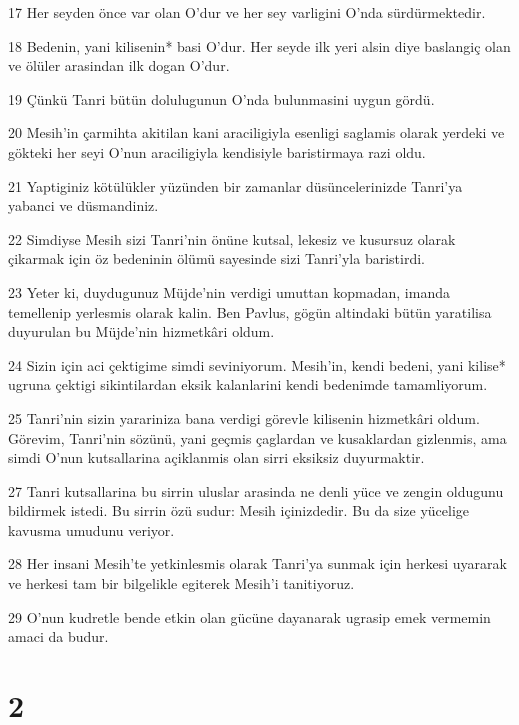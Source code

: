 \par 17 Her seyden önce var olan O'dur ve her sey varligini O'nda sürdürmektedir.
\par 18 Bedenin, yani kilisenin* basi O'dur. Her seyde ilk yeri alsin diye baslangiç olan ve ölüler arasindan ilk dogan O'dur.
\par 19 Çünkü Tanri bütün dolulugunun O'nda bulunmasini uygun gördü.
\par 20 Mesih'in çarmihta akitilan kani araciligiyla esenligi saglamis olarak yerdeki ve gökteki her seyi O'nun araciligiyla kendisiyle baristirmaya razi oldu.
\par 21 Yaptiginiz kötülükler yüzünden bir zamanlar düsüncelerinizde Tanri'ya yabanci ve düsmandiniz.
\par 22 Simdiyse Mesih sizi Tanri'nin önüne kutsal, lekesiz ve kusursuz olarak çikarmak için öz bedeninin ölümü sayesinde sizi Tanri'yla baristirdi.
\par 23 Yeter ki, duydugunuz Müjde'nin verdigi umuttan kopmadan, imanda temellenip yerlesmis olarak kalin. Ben Pavlus, gögün altindaki bütün yaratilisa duyurulan bu Müjde'nin hizmetkâri oldum.
\par 24 Sizin için aci çektigime simdi seviniyorum. Mesih'in, kendi bedeni, yani kilise* ugruna çektigi sikintilardan eksik kalanlarini kendi bedenimde tamamliyorum.
\par 25 Tanri'nin sizin yarariniza bana verdigi görevle kilisenin hizmetkâri oldum. Görevim, Tanri'nin sözünü, yani geçmis çaglardan ve kusaklardan gizlenmis, ama simdi O'nun kutsallarina açiklanmis olan sirri eksiksiz duyurmaktir.
\par 27 Tanri kutsallarina bu sirrin uluslar arasinda ne denli yüce ve zengin oldugunu bildirmek istedi. Bu sirrin özü sudur: Mesih içinizdedir. Bu da size yücelige kavusma umudunu veriyor.
\par 28 Her insani Mesih'te yetkinlesmis olarak Tanri'ya sunmak için herkesi uyararak ve herkesi tam bir bilgelikle egiterek Mesih'i tanitiyoruz.
\par 29 O'nun kudretle bende etkin olan gücüne dayanarak ugrasip emek vermemin amaci da budur.

\chapter{2}

